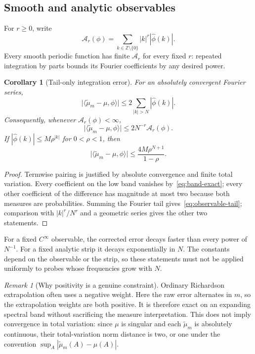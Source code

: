 \documentclass[11pt,a4paper]{article}
\numberwithin{equation}{section}
\newtheorem{corollary}[theorem]{Corollary}
\theoremstyle{definition}
\theoremstyle{remark}
\newtheorem{remark}[theorem]{Remark}
\newcommand{\Z}{\mathbb Z}
\newcommand{\mt}{\widetilde\mu}
\newcommand{\pair}[2]{\langle #1,#2\rangle}
\newcommand{\abs}[1]{\lvert #1\rvert}
\newcommand{\Ast}{\mathcal A}
\begin{document}
\subsection{Smooth and analytic observables}
For $r\ge0$, write
\begin{equation}
 \Ast_r(\phi)=\sum_{k\in\Z\setminus\{0\}}|k|^r|\widehat\phi(k)|.
 \label{eq:wiener}
\end{equation}
Every smooth periodic function has finite $\Ast_r$ for every fixed $r$: repeated
integration by parts bounds its Fourier coefficients by any desired power.

\begin{corollary}[Tail-only integration error]
\label{cor:observable}
For an absolutely convergent Fourier series,
\begin{equation}
 \abs{\pair{\mt_m-\mu}{\phi}}
 \le2\sum_{|k|>N}|\widehat\phi(k)|.
 \label{eq:observable-tail}
\end{equation}
Consequently, whenever $\Ast_r(\phi)<\infty$,
\begin{equation}
 \abs{\pair{\mt_m-\mu}{\phi}}\le2N^{-r}\Ast_r(\phi).
 \label{eq:observable-power}
\end{equation}
If $|\widehat\phi(k)|\le M\rho^{|k|}$ for $0<\rho<1$, then
\begin{equation}
 \abs{\pair{\mt_m-\mu}{\phi}}
 \le\frac{4M\rho^{N+1}}{1-\rho}.
 \label{eq:observable-exp}
\end{equation}
\end{corollary}
\begin{proof}
Termwise pairing is justified by absolute convergence and finite total variation.
Every coefficient on the low band vanishes by~\eqref{eq:band-exact}; every other
coefficient of the difference has magnitude at most two because both measures
are probabilities. Summing the Fourier tail gives~\eqref{eq:observable-tail};
comparison with $|k|^r/N^r$ and a geometric series gives the other two statements.
\end{proof}

For a fixed $C^\infty$ observable, the corrected error decays faster than every
power of $N^{-1}$. For a fixed analytic strip it decays exponentially in $N$.
The constants depend on the observable or the strip, so these statements must
not be applied uniformly to probes whose frequencies grow with $N$.

\begin{remark}[Why positivity is a genuine constraint]
Ordinary Richardson extrapolation often uses a negative weight. Here the raw
error alternates in $m$, so the extrapolation weights are both positive. It is
therefore exact on an expanding spectral band without sacrificing the measure
interpretation. This does not imply convergence in total variation: since $\mu$
is singular and each $\mt_m$ is absolutely continuous, their total-variation norm
distance is two, or one under the convention $\sup_A|\mt_m(A)-\mu(A)|$.
\end{remark}
\end{document}
